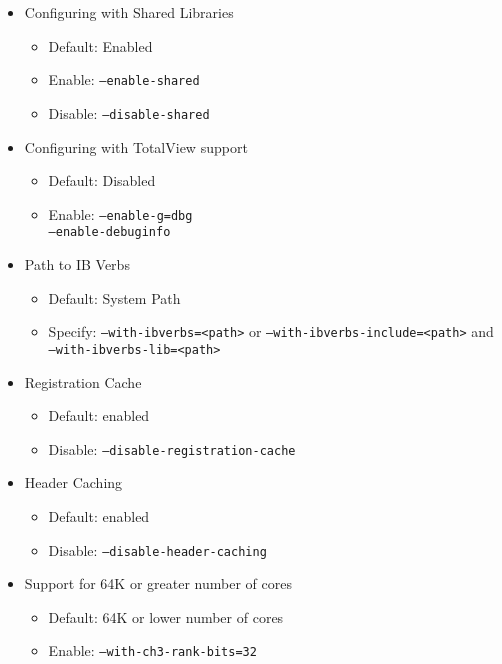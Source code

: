 \begin{itemize}
	\item Configuring with Shared Libraries
		\begin{itemize}
			\item Default: Enabled
			\item Enable: \texttt{--enable-shared}
            \item Disable: \texttt{--disable-shared}
		\end{itemize}

	\item Configuring with TotalView support
		\begin{itemize}
			\item Default: Disabled
			\item Enable: \texttt{--enable-g=dbg \\
				--enable-debuginfo}
		\end{itemize}

        \item Path to IB Verbs
        \begin{itemize}
            \item Default: System Path
            \item Specify: \texttt{--with-ibverbs=<path>} or
            \newline \texttt{--with-ibverbs-include=<path>} and \texttt{--with-ibverbs-lib=<path>}
        \end{itemize}

	\item Registration Cache
	\begin{itemize}
		\item Default: enabled
		\item Disable: \texttt{--disable-registration-cache}
	\end{itemize}

	\item Header Caching
	\begin{itemize}
		\item Default: enabled
		\item Disable: \texttt{--disable-header-caching}
	\end{itemize}
	\item Support for 64K or greater number of cores
		\begin{itemize}
			\item Default: 64K or lower number of cores
			\item Enable: \texttt{--with-ch3-rank-bits=32}
		\end{itemize}


\end{itemize}
